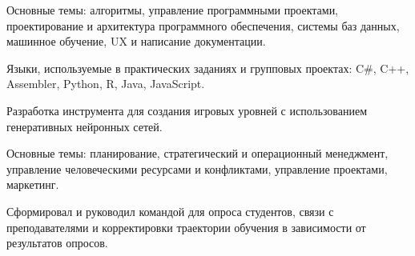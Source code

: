 \documentclass[
	a4paper,
]{killme}
\begin{document}
\makefrontsidebar

\begin{cvtable}[1.5]
	   {\par %
        Основные темы: алгоритмы, управление программными проектами, проектирование и архитектура программного обеспечения, системы баз данных, машинное обучение, UX и написание документации.\par \vspace{0.1cm}
        Языки, используемые в практических заданиях и групповых проектах: C\#, C++, Assembler, Python, R, Java, JavaScript.\par 
        \vspace{0.15cm}} 
		{Разработка инструмента для создания игровых уровней с использованием генеративных нейронных сетей.}
\end{cvtable}

\begin{cvtable}[1.5]
		{\par
        Основные темы: планирование, стратегический и операционный менеджмент, управление человеческими ресурсами и конфликтами, управление проектами, маркетинг.\par \vspace{0.1cm}
        Сформировал и руководил командой для опроса студентов, связи с преподавателями и корректировки траектории обучения в зависимости от результатов опросов.}
\end{cvtable}
\end{document}
